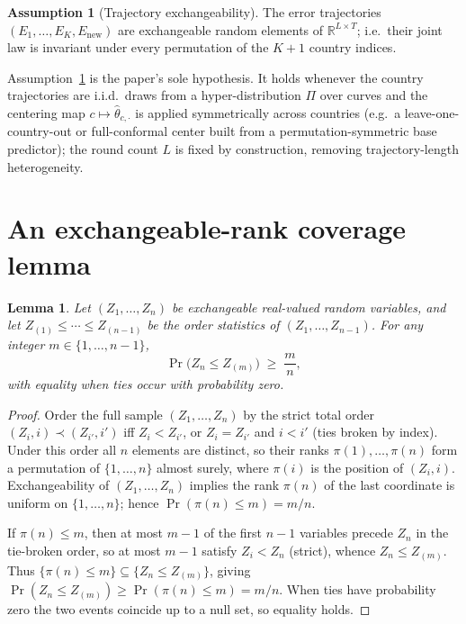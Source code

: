 \documentclass[12pt]{article}
\newtheorem{lemma}{Lemma}
\theoremstyle{definition}
\newtheorem{assumption}{Assumption}
\theoremstyle{remark}
\begin{document}
\begin{assumption}[Trajectory exchangeability]\label{ass:exch}
The error trajectories $(E_1,\dots,E_K,E_{\mathrm{new}})$ are exchangeable random elements
of $\mathbb{R}^{L\times T}$; i.e.\ their joint law is invariant under every permutation of
the $K+1$ country indices.
\end{assumption}

\noindent
Assumption~\ref{ass:exch} is the paper's sole hypothesis. It holds whenever the country
trajectories are i.i.d.\ draws from a hyper-distribution $\Pi$ over curves and the centering
map $c\mapsto\widehat\theta_{c,\cdot}$ is applied symmetrically across countries (e.g.\ a
leave-one-country-out or full-conformal center built from a permutation-symmetric base
predictor); the round count $L$ is fixed by construction, removing trajectory-length
heterogeneity.

\section*{An exchangeable-rank coverage lemma}

\begin{lemma}\label{lem:rank}
Let $(Z_1,\dots,Z_n)$ be exchangeable real-valued random variables, and let
$Z_{(1)}\le\cdots\le Z_{(n-1)}$ be the order statistics of $(Z_1,\dots,Z_{n-1})$. For any
integer $m\in\{1,\dots,n-1\}$,
\[
  \Pr\big(Z_n \le Z_{(m)}\big)\;\ge\;\frac{m}{n},
\]
with equality when ties occur with probability zero.
\end{lemma}

\begin{proof}
Order the full sample $(Z_1,\dots,Z_n)$ by the strict total order
$(Z_i,i)\prec(Z_{i'},i')$ iff $Z_i<Z_{i'}$, or $Z_i=Z_{i'}$ and $i<i'$ (ties broken by
index). Under this order all $n$ elements are distinct, so their ranks
$\pi(1),\dots,\pi(n)$ form a permutation of $\{1,\dots,n\}$ almost surely, where $\pi(i)$ is
the position of $(Z_i,i)$. Exchangeability of $(Z_1,\dots,Z_n)$ implies the rank $\pi(n)$ of
the last coordinate is uniform on $\{1,\dots,n\}$; hence $\Pr(\pi(n)\le m)=m/n$.

If $\pi(n)\le m$, then at most $m-1$ of the first $n-1$ variables precede $Z_n$ in the
tie-broken order, so at most $m-1$ satisfy $Z_i<Z_n$ (strict), whence $Z_n\le Z_{(m)}$.
Thus $\{\pi(n)\le m\}\subseteq\{Z_n\le Z_{(m)}\}$, giving
$\Pr(Z_n\le Z_{(m)})\ge \Pr(\pi(n)\le m)=m/n$. When ties have probability zero the two
events coincide up to a null set, so equality holds.
\end{proof}
\end{document}
